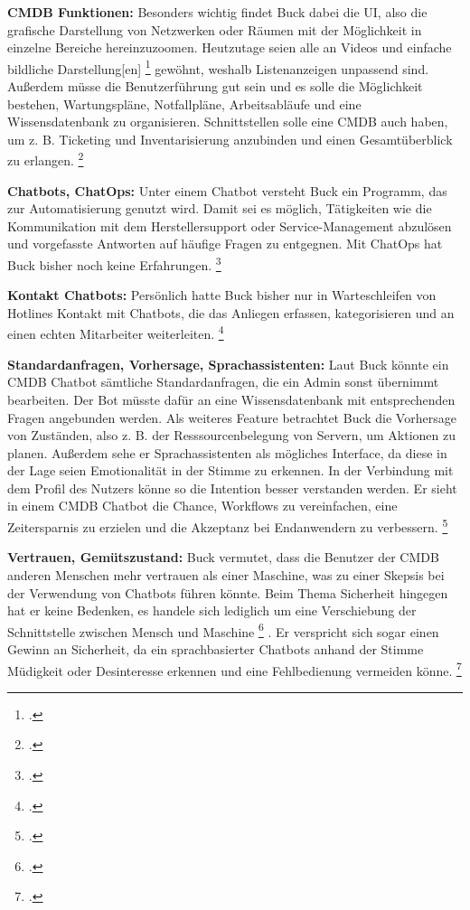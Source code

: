 \textbf{CMDB Funktionen: }Besonders wichtig findet Buck dabei die UI, also die grafische Darstellung von Netzwerken oder Räumen mit der Möglichkeit in einzelne Bereiche hereinzuzoomen. Heutzutage seien alle an Videos und \glqq{}einfache bildliche Darstellung[en]\grqq
\footcite[][o. \pno]{Buck_2019}
 gewöhnt, weshalb Listenanzeigen unpassend sind. Außerdem müsse die Benutzerführung gut sein und es solle die Möglichkeit bestehen, Wartungspläne, Notfallpläne, Arbeitsabläufe und eine Wissensdatenbank zu organisieren. Schnittstellen solle eine \acs{CMDB} auch haben, um z. B. Ticketing und Inventarisierung anzubinden und einen Gesamtüberblick zu erlangen. 
\footcite[Vgl.][o. \pno]{Buck_2019}

\textbf{Chatbots, ChatOps: }Unter einem Chatbot versteht Buck ein Programm, das zur Automatisierung genutzt wird. Damit sei es möglich, Tätigkeiten wie die Kommunikation mit dem Herstellersupport oder Service-Management abzulösen und vorgefasste Antworten auf häufige Fragen zu entgegnen. Mit ChatOps hat Buck bisher noch keine Erfahrungen.
\footcite[Vgl.][o. \pno]{Buck_2019}

\textbf{Kontakt Chatbots: }Persönlich hatte Buck bisher nur in Warteschleifen von Hotlines Kontakt mit Chatbots, die das Anliegen erfassen, kategorisieren und an einen echten Mitarbeiter weiterleiten.
\footcite[Vgl.][o. \pno]{Buck_2019}

\textbf{Standardanfragen, Vorhersage, Sprachassistenten: }Laut Buck könnte ein \acs{CMDB} Chatbot sämtliche Standardanfragen, die ein Admin sonst übernimmt bearbeiten. Der Bot müsste dafür an eine Wissensdatenbank mit entsprechenden Fragen angebunden werden.
Als weiteres Feature betrachtet Buck die Vorhersage von Zuständen, also z. B. der Resssourcenbelegung von Servern, um Aktionen zu planen. Außerdem sehe er Sprachassistenten als mögliches Interface, da diese in der Lage seien Emotionalität in der Stimme zu erkennen. In der Verbindung mit dem Profil des Nutzers könne so die Intention besser verstanden werden. Er sieht in einem \acs{CMDB} Chatbot die Chance, Workflows zu vereinfachen, eine Zeitersparnis zu erzielen und die Akzeptanz bei Endanwendern zu verbessern. 
\footcite[Vgl.][o. \pno]{Buck_2019}

\textbf{Vertrauen, Gemütszustand: }Buck vermutet, dass die Benutzer der \acs{CMDB} anderen Menschen mehr vertrauen als einer Maschine, was zu einer Skepsis bei der Verwendung von Chatbots führen könnte. Beim Thema Sicherheit hingegen hat er keine Bedenken, es handele sich lediglich um eine Verschiebung \glqq{}der Schnittstelle zwischen Mensch und Maschine\grqq
\footcite[][o. \pno]{Buck_2019}
. Er verspricht sich sogar einen Gewinn an Sicherheit, da ein sprachbasierter Chatbots anhand der Stimme Müdigkeit oder Desinteresse erkennen und eine Fehlbedienung vermeiden könne. 
\footcite[Vgl.][o. \pno]{Buck_2019}

